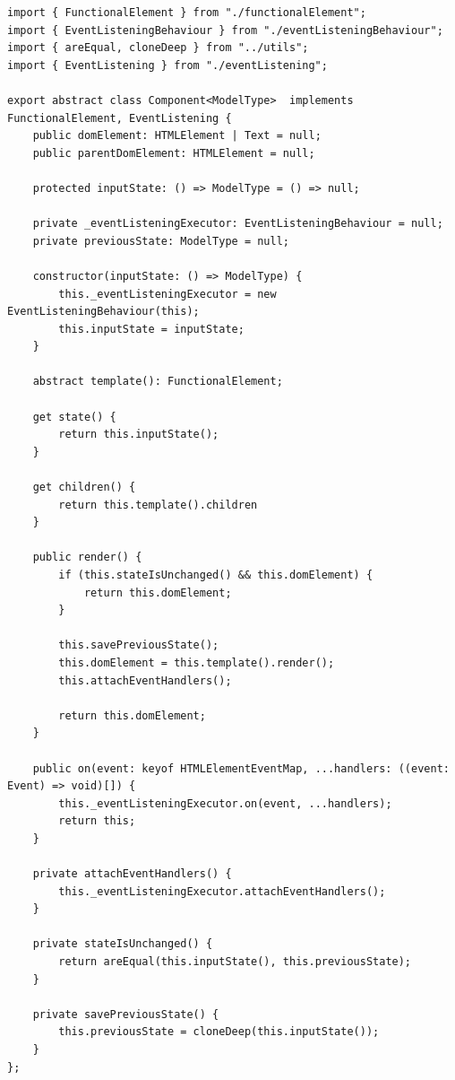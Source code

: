 \documentclass[12pt,oneside]{memoir}
\newcommand{\code}[1]{\allowbreak{\colorbox{codegray}{\texttt{\scalebox{0.9}{#1}}}}}%
\begin{document}
\begin{lstlisting}[style=jsStyle, escapeinside=\#\#, caption={Fajl \code{core/component.ts}},label=file:core:component.ts]
import { FunctionalElement } from "./functionalElement";
import { EventListeningBehaviour } from "./eventListeningBehaviour";
import { areEqual, cloneDeep } from "../utils";
import { EventListening } from "./eventListening";

export abstract class Component<ModelType>  implements FunctionalElement, EventListening {
    public domElement: HTMLElement | Text = null;
    public parentDomElement: HTMLElement = null;

    protected inputState: () => ModelType = () => null;

    private _eventListeningExecutor: EventListeningBehaviour = null;
    private previousState: ModelType = null;

    constructor(inputState: () => ModelType) {
        this._eventListeningExecutor = new EventListeningBehaviour(this);
        this.inputState = inputState;
    }

    abstract template(): FunctionalElement;

    get state() {
        return this.inputState();
    }

    get children() {
        return this.template().children
    }

    public render() {
        if (this.stateIsUnchanged() && this.domElement) {
            return this.domElement;
        }

        this.savePreviousState();
        this.domElement = this.template().render();
        this.attachEventHandlers();

        return this.domElement;
    }

    public on(event: keyof HTMLElementEventMap, ...handlers: ((event: Event) => void)[]) {
        this._eventListeningExecutor.on(event, ...handlers);
        return this;
    }

    private attachEventHandlers() {
        this._eventListeningExecutor.attachEventHandlers();
    }
    
    private stateIsUnchanged() {
        return areEqual(this.inputState(), this.previousState);
    }

    private savePreviousState() {
        this.previousState = cloneDeep(this.inputState());
    }
};

\end{lstlisting}
\end{document}
